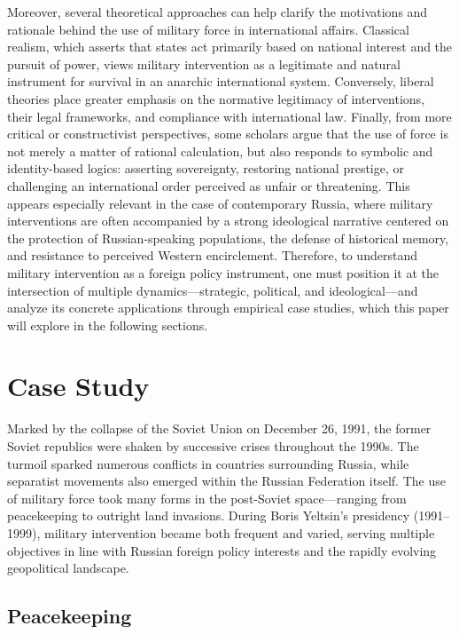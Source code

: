 \documentclass[12pt]{article}
\begin{document}
Moreover, several theoretical approaches can help clarify the motivations and rationale behind the use of military force in international affairs. Classical realism, which asserts that states act primarily based on national interest and the pursuit of power, views military intervention as a legitimate and natural instrument for survival in an anarchic international system. Conversely, liberal theories place greater emphasis on the normative legitimacy of interventions, their legal frameworks, and compliance with international law.
Finally, from more critical or constructivist perspectives, some scholars argue that the use of force is not merely a matter of rational calculation, but also responds to symbolic and identity-based logics: asserting sovereignty, restoring national prestige, or challenging an international order perceived as unfair or threatening. This appears especially relevant in the case of contemporary Russia, where military interventions are often accompanied by a strong ideological narrative centered on the protection of Russian-speaking populations, the defense of historical memory, and resistance to perceived Western encirclement.
Therefore, to understand military intervention as a foreign policy instrument, one must position it at the intersection of multiple dynamics—strategic, political, and ideological—and analyze its concrete applications through empirical case studies, which this paper will explore in the following sections.



\section*{Case Study}
Marked by the collapse of the Soviet Union on December 26, 1991, the former Soviet republics were shaken by successive crises throughout the 1990s. The turmoil sparked numerous conflicts in countries surrounding Russia, while separatist movements also emerged within the Russian Federation itself. The use of military force took many forms in the post-Soviet space—ranging from peacekeeping to outright land invasions. During Boris Yeltsin’s presidency (1991–1999), military intervention became both frequent and varied, serving multiple objectives in line with Russian foreign policy interests and the rapidly evolving geopolitical landscape.
\subsection*{Peacekeeping}
\end{document}
